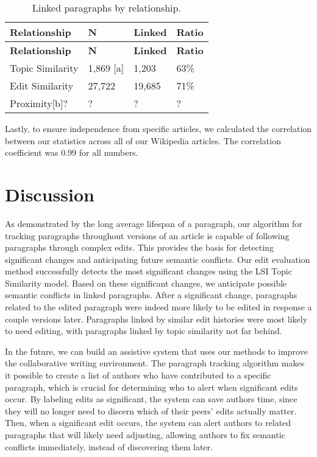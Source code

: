 \begin{longtable}[c]{@{}llll@{}}
\caption{Linked paragraphs by relationship.{}}\tabularnewline
\toprule
\textbf{Relationship} & \textbf{N} & \textbf{Linked} &
\textbf{Ratio}\tabularnewline
\midrule
\endfirsthead
\toprule
\textbf{Relationship} & \textbf{N} & \textbf{Linked} &
\textbf{Ratio}\tabularnewline
\midrule
\endhead
Topic Similarity & 1,869 {[}a{]} & 1,203 & 63\%\tabularnewline
Edit Similarity & 27,722 & 19,685 & 71\%\tabularnewline
Proximity{[}b{]}? & ? & ? & ?\tabularnewline
\bottomrule
\end{longtable}

Lastly, to ensure independence from specific articles, we calculated the
correlation between our statistics across all of our Wikipedia articles.
The correlation coefficient was 0.99 for all numbers.

\section{Discussion}\label{discussion}

As demonstrated by the long average lifespan of a paragraph, our
algorithm for tracking paragraphs throughout versions of an article is
capable of following paragraphs through complex edits. This provides the
basis for detecting significant changes and anticipating future semantic
conflicts. Our edit evaluation method successfully detects the most
significant changes using the LSI Topic Similarity model. Based on these
significant changes, we anticipate possible semantic conflicts in linked
paragraphs. After a significant change, paragraphs related to the edited
paragraph were indeed more likely to be edited in response a couple
versions later. Paragraphs linked by similar edit histories were most
likely to need editing, with paragraphs linked by topic similarity not
far behind.

In the future, we can build an assistive system that uses our methods to
improve the collaborative writing environment. The paragraph tracking
algorithm makes it possible to create a list of authors who have
contributed to a specific paragraph, which is crucial for determining
who to alert when significant edits occur. By labeling edits as
significant, the system can save authors time, since they will no longer
need to discern which of their peers' edits actually matter. Then, when
a significant edit occurs, the system can alert authors to related
paragraphs that will likely need adjusting, allowing authors to fix
semantic conflicts immediately, instead of discovering them later.

